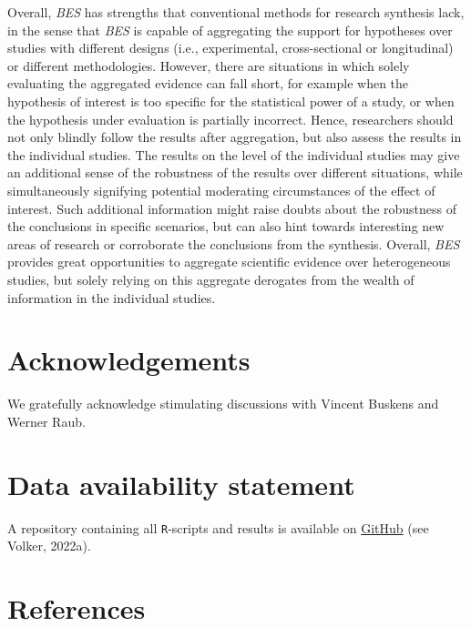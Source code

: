 \documentclass[
]{interact}
\begin{document}
Overall, \emph{BES} has strengths that conventional methods for research
synthesis lack, in the sense that \emph{BES} is capable of aggregating
the support for hypotheses over studies with different designs (i.e.,
experimental, cross-sectional or longitudinal) or different
methodologies. However, there are situations in which solely evaluating
the aggregated evidence can fall short, for example when the hypothesis
of interest is too specific for the statistical power of a study, or
when the hypothesis under evaluation is partially incorrect. Hence,
researchers should not only blindly follow the results after
aggregation, but also assess the results in the individual studies. The
results on the level of the individual studies may give an additional
sense of the robustness of the results over different situations, while
simultaneously signifying potential moderating circumstances of the
effect of interest. Such additional information might raise doubts about
the robustness of the conclusions in specific scenarios, but can also
hint towards interesting new areas of research or corroborate the
conclusions from the synthesis. Overall, \emph{BES} provides great
opportunities to aggregate scientific evidence over heterogeneous
studies, but solely relying on this aggregate derogates from the wealth
of information in the individual studies.

\hypertarget{acknowledgements}{%
\section{Acknowledgements}\label{acknowledgements}}

We gratefully acknowledge stimulating discussions with Vincent Buskens
and Werner Raub.

\hypertarget{data-availability-statement}{%
\section{Data availability
statement}\label{data-availability-statement}}

A repository containing all \texttt{R}-scripts and results is available
on
\href{https://www.github.com/thomvolker/Master_Thesis/tree/master/MSBBSS/simulations}{GitHub}
(see Volker, 2022a).

\hypertarget{references}{%
\section{References}\label{references}}
\end{document}
